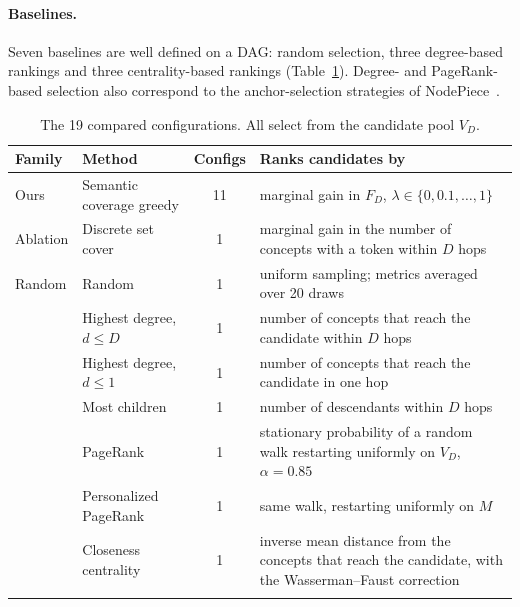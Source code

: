 \paragraph{Baselines.}
Seven baselines are well defined on a DAG: random selection, three degree-based rankings and three centrality-based rankings (Table~\ref{tab:baselines}).
Degree- and PageRank-based selection also correspond to the anchor-selection strategies of NodePiece~\cite{galkin2022nodepiece}.

\begin{table}[t]
\centering
\small
\renewcommand{\arraystretch}{1.2}
\setlength{\tabcolsep}{4pt}
\begin{tabular}{@{}>{\raggedright\arraybackslash}p{1.6cm}>{\raggedright\arraybackslash}p{3.0cm}c>{\raggedright\arraybackslash}p{7.6cm}@{}}
\toprule
\textbf{Family} & \textbf{Method} & \textbf{Configs} & \textbf{Ranks candidates by} \\
\midrule
Ours & Semantic coverage greedy & 11 & marginal gain in $F_D$, $\lambda \in \{0, 0.1, \dots, 1\}$ \\
Ablation & Discrete set cover & 1 & marginal gain in the number of concepts with a token within $D$ hops \\
Random & Random & 1 & uniform sampling; metrics averaged over 20 draws \\
\midrule
\multirow{3}{*}{Degree} & Highest degree, $d \le D$ & 1 & number of concepts that reach the candidate within $D$ hops \\
 & Highest degree, $d \le 1$ & 1 & number of concepts that reach the candidate in one hop \\
 & Most \isa{} children & 1 & number of descendants within $D$ \isa{} hops \\
\midrule
\multirow{3}{*}{Centrality} & PageRank & 1 & stationary probability of a random walk restarting uniformly on $V_D$, $\alpha = 0.85$ \cite{page1999pagerank} \\
 & Personalized PageRank & 1 & same walk, restarting uniformly on $M$ \cite{haveliwala2002topic} \\
 & Closeness centrality & 1 & inverse mean distance from the concepts that reach the candidate, with the Wasserman--Faust correction \cite{freeman1978centrality, wasserman1994social} \\
\midrule
\multicolumn{2}{@{}l}{\textbf{Total}} & 19 & \\
\bottomrule
\end{tabular}
\caption{The 19 compared configurations. All select from the candidate pool $V_D$.}
\label{tab:baselines}
\end{table}

